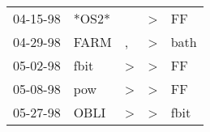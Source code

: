 \begin{supertabular}{lllll}
 04-15-98 &  *OS2* &               &  \textgreater &    FF \\
 04-29-98 &   FARM &             , &  \textgreater &  bath \\
 05-02-98 &   fbit &  \textgreater &  \textgreater &    FF \\
 05-08-98 &    pow &  \textgreater &  \textgreater &    FF \\
 05-27-98 &   OBLI &  \textgreater &  \textgreater &  fbit \\
\end{supertabular}
